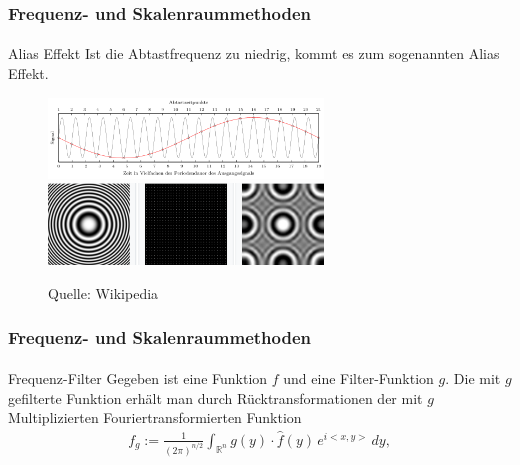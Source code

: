 \documentclass{beamer}
\begin{document}
\begin{frame}
    \frametitle{Frequenz- und Skalenraummethoden}
\framesubtitle{}

\begin{block}{Alias Effekt}
Ist die Abtastfrequenz zu niedrig, kommt es zum sogenannten Alias Effekt.
\end{block}
\begin{figure}[htp]
      \centering
    \includegraphics[width=0.65\textwidth]{img/Alias} \\ 
    \includegraphics[width=0.65\textwidth]{img/Alias_img}
      \caption{Quelle: Wikipedia}
\end{figure}

 \end{frame}

\begin{frame}
    \frametitle{Frequenz- und Skalenraummethoden}
\framesubtitle{}

\begin{block}{Frequenz-Filter}
Gegeben ist eine Funktion $f$ und eine Filter-Funktion $g$. 
Die mit $g$ gefilterte Funktion erhält man durch  Rücktransformationen  der mit $g$ Multiplizierten Fouriertransformierten Funktion 
\begin{align*}
f_g := \frac{1}{\left(2\pi \right)^{n/2}} \int_{\mathbb{R}^n} g(y) \cdot \hat{ f}(y) \,e^{i  <x, y>} \, d y,
\end{align*}
\end{block}

 \end{frame}
\end{document}

